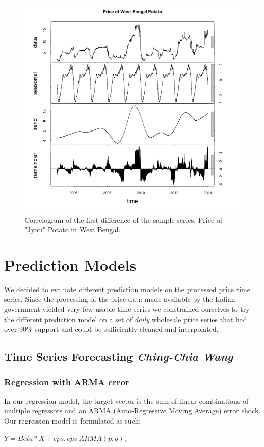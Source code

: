 \begin{figure}
    \centering
    \includegraphics[width=.7\textwidth]{./img/seasonal.png}
    \caption{Correlogram of the first difference of the sample series: Price of "Jyoti" Potato in West Bengal.}
\end{figure}


\section*{Prediction Models}
We decided to evaluate different prediction models on the processed price time series. Since the processing of the price data made available by the Indian government yielded very few usable time series we constrained ourselves to try the different prediction model on a set of \emph{daily} wholesale price series that had over 90\% support and could be sufficiently cleaned and interpolated.

\subsection*{Time Series Forecasting \footnotesize\textit{Ching-Chia Wang}}

\subsubsection*{Regression with ARMA error}
In our regression model, the target vector is the sum of linear combinations of multiple regressors and an ARMA (Auto-Regressive Moving Average) error shock. Our regression model is formulated as such:

$Y = Beta*X + eps,   eps ~ ARMA(p,q)$,

